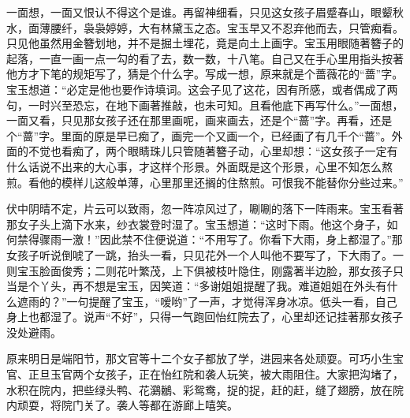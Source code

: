 \begin{parag}


    一面想，一面又恨认不得这个是谁。再留神细看，只见这女孩子眉蹙春山，眼颦秋水，面薄腰纤，袅袅婷婷，大有林黛玉之态。宝玉早又不忍弃他而去，只管痴看。只见他虽然用金簪划地，并不是掘土埋花，竟是向土上画字。宝玉用眼随著簪子的起落，一直一画一点一勾的看了去，数一数，十八笔。自己又在手心里用指头按著他方才下笔的规矩写了，猜是个什么字。写成一想，原来就是个蔷薇花的“蔷”字。宝玉想道：“必定是他也要作诗填词。这会子见了这花，因有所感，或者偶成了两句，一时兴至恐忘，在地下画著推敲，也未可知。且看他底下再写什么。”一面想，一面又看，只见那女孩子还在那里画呢，画来画去，还是个“蔷”字。再看，还是个“蔷”字。里面的原是早已痴了，画完一个又画一个，已经画了有几千个“蔷”。外面的不觉也看痴了，两个眼睛珠儿只管随著簪子动，心里却想：“这女孩子一定有什么话说不出来的大心事，才这样个形景。外面既是这个形景，心里不知怎么熬煎。看他的模样儿这般单薄，心里那里还搁的住熬煎。可恨我不能替你分些过来。”
\end{parag}


\begin{parag}


    伏中阴晴不定，片云可以致雨，忽一阵凉风过了，唰唰的落下一阵雨来。宝玉看著那女子头上滴下水来，纱衣裳登时湿了。宝玉想道：“这时下雨。他这个身子，如何禁得骤雨一激！”因此禁不住便说道：“不用写了。你看下大雨，身上都湿了。”那女孩子听说倒唬了一跳，抬头一看，只见花外一个人叫他不要写了，下大雨了。一则宝玉脸面俊秀；二则花叶繁茂，上下俱被枝叶隐住，刚露著半边脸，那女孩子只当是个丫头，再不想是宝玉，因笑道：“多谢姐姐提醒了我。难道姐姐在外头有什么遮雨的？”一句提醒了宝玉，“嗳哟”了一声，才觉得浑身冰凉。低头一看，自己身上也都湿了。说声“不好”，只得一气跑回怡红院去了，心里却还记挂著那女孩子没处避雨。
\end{parag}


\begin{parag}


    原来明日是端阳节，那文官等十二个女子都放了学，进园来各处顽耍。可巧小生宝官、正旦玉官两个女孩子，正在怡红院和袭人玩笑，被大雨阻住。大家把沟堵了，水积在院内，把些绿头鸭、花鸂鶒、彩鸳鸯，捉的捉，赶的赶，缝了翅膀，放在院内顽耍，将院门关了。袭人等都在游廊上嘻笑。
\end{parag}



